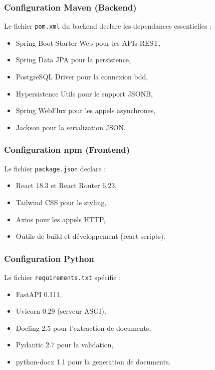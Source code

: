 \subsubsection{Configuration Maven (Backend)}

Le fichier \texttt{pom.xml} du backend declare les dependances essentielles :

\begin{itemize}
    \item Spring Boot Starter Web pour les APIs REST,
    \item Spring Data JPA pour la persistence,
    \item PostgreSQL Driver pour la connexion \acrshort{bdd},
    \item Hypersistence Utils pour le support JSONB,
    \item Spring WebFlux pour les appels asynchrones,
    \item Jackson pour la serialization JSON.
\end{itemize}

\subsubsection{Configuration npm (Frontend)}

Le fichier \texttt{package.json} declare :

\begin{itemize}
    \item React 18.3 et React Router 6.23,
    \item Tailwind CSS pour le styling,
    \item Axios pour les appels HTTP,
    \item Outils de build et développement (react-scripts).
\end{itemize}

\subsubsection{Configuration Python}

Le fichier \texttt{requirements.txt} spécifie :

\begin{itemize}
    \item FastAPI 0.111,
    \item Uvicorn 0.29 (serveur ASGI),
    \item Docling 2.5 pour l'extraction de documents,
    \item Pydantic 2.7 pour la validation,
    \item python-docx 1.1 pour la generation de documents.
\end{itemize}

